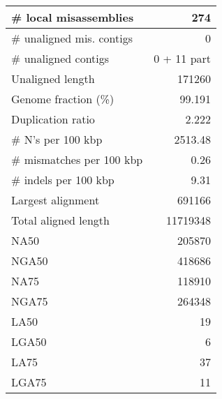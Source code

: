 \documentclass[a4paper]{article}
\begin{document}
\begin{table}[ht]
\begin{center}
\begin{tabular}{|l*{1}{|r}|}
\# local misassemblies & 274 \\ \hline
\# unaligned mis. contigs & 0 \\ \hline
\# unaligned contigs & 0 + 11 part \\ \hline
Unaligned length & 171260 \\ \hline
Genome fraction (\%) & 99.191 \\ \hline
Duplication ratio & 2.222 \\ \hline
\# N's per 100 kbp & 2513.48 \\ \hline
\# mismatches per 100 kbp & 0.26 \\ \hline
\# indels per 100 kbp & 9.31 \\ \hline
Largest alignment & 691166 \\ \hline
Total aligned length & 11719348 \\ \hline
NA50 & 205870 \\ \hline
NGA50 & 418686 \\ \hline
NA75 & 118910 \\ \hline
NGA75 & 264348 \\ \hline
LA50 & 19 \\ \hline
LGA50 & 6 \\ \hline
LA75 & 37 \\ \hline
LGA75 & 11 \\ \hline
\end{tabular}
\end{center}
\end{table}
\end{document}
